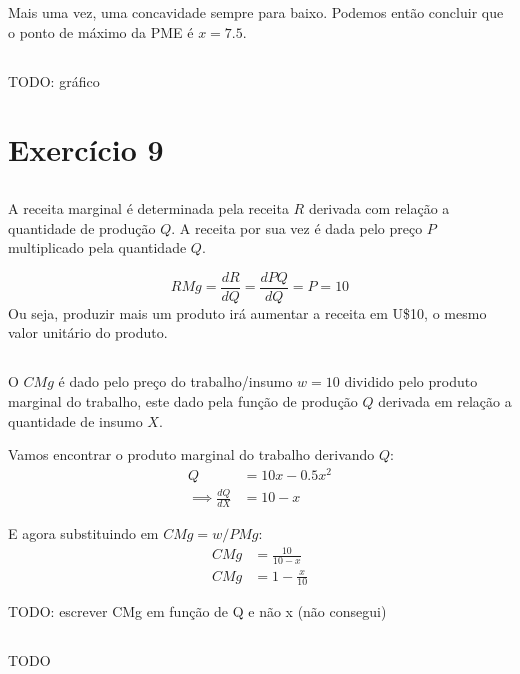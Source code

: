 \documentclass{article}
\begin{document}
Mais uma vez, uma concavidade sempre para baixo. Podemos então concluir que o
ponto de máximo da PME é \(x=7.5\).

\subsection{}

TODO: gráfico

\section{Exercício 9}
\subsection{}

A receita marginal é determinada pela receita \(R\) derivada com relação a
quantidade de produção \(Q\). A receita por sua vez é dada pelo preço \(P\)
multiplicado pela quantidade \(Q\).

\[
	RMg = \frac{dR}{dQ} = \frac{dPQ}{dQ} = P = 10
\]
Ou seja, produzir mais um produto irá aumentar a receita em U\$10, o mesmo
valor unitário do produto.

\subsection{}

O \(CMg\) é dado pelo preço do trabalho/insumo \(w = 10\) dividido pelo produto
marginal do trabalho, este dado pela função de produção \(Q\) derivada em
relação a quantidade de insumo \(X\).

Vamos encontrar o produto marginal do trabalho derivando \(Q\):
\[
	\begin{aligned}
		Q                      & = 10x - 0.5x^2 \\
		\implies \frac{dQ}{dX} & = 10 - x
	\end{aligned}
\]

E agora substituindo em \(CMg = w/PMg\):
\[
	\begin{aligned}
		CMg & = \frac{10}{10 - x} \\
		CMg & = 1 - \frac{x}{10}
	\end{aligned}
\]

TODO: escrever CMg em função de Q e não x (não consegui)

\subsection{}
TODO
\end{document}
